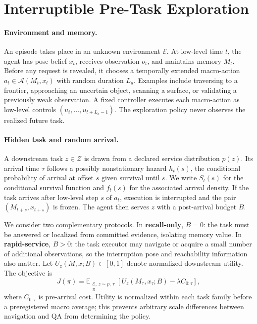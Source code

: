 \section{Interruptible Pre-Task Exploration}
\label{sec:problem}

\paragraph{Environment and memory.}
An episode takes place in an unknown environment $\mathcal{E}$.
At low-level time $t$, the agent has pose belief $x_t$, receives observation $o_t$, and maintains memory $M_t$.
Before any request is revealed, it chooses a temporally extended macro-action $a_t \in \mathcal{A}(M_t,x_t)$ with random duration $L_a$.
Examples include traversing to a frontier, approaching an uncertain object, scanning a surface, or validating a previously weak observation.
A fixed controller executes each macro-action as low-level controls $(u_{t},\ldots,u_{t+L_a-1})$.
The exploration policy never observes the realized future task.

\paragraph{Hidden task and random arrival.}
A downstream task $z\in\mathcal{Z}$ is drawn from a declared service distribution $p(z)$.
Its arrival time $\tau$ follows a possibly nonstationary hazard $h_t(s)$, the conditional probability of arrival at offset $s$ given survival until $s$.
We write $S_t(s)$ for the conditional survival function and $f_t(s)$ for the associated arrival density.
If the task arrives after low-level step $s$ of $a_t$, execution is interrupted and the pair $(M_{t+s},x_{t+s})$ is frozen.
The agent then serves $z$ with a post-arrival budget $B$.

We consider two complementary protocols.
In \textbf{recall-only}, $B=0$: the task must be answered or localized from committed evidence, isolating memory value.
In \textbf{rapid-service}, $B>0$: the task executor may navigate or acquire a small number of additional observations, so the interruption pose and reachability information also matter.
Let $U_z(M,x;B)\in[0,1]$ denote normalized downstream utility.
The objective is
\begin{equation}
\label{eq:objective}
J(\pi)=
\mathbb{E}_{\substack{\mathcal{E},\,z\sim p,\,\tau\\\pi}}
\left[
U_z(M_\tau,x_\tau;B)
-\lambda C_{0:\tau}
\right],
\end{equation}
where $C_{0:\tau}$ is pre-arrival cost.
Utility is normalized within each task family before a preregistered macro average; this prevents arbitrary scale differences between navigation and QA from determining the policy.

